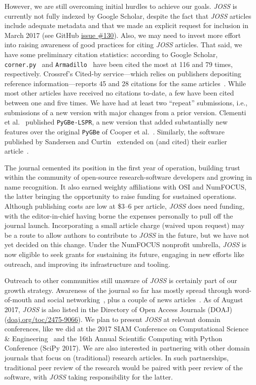 \documentclass{article}
\newcommand\joss{\textit{JOSS}}
\begin{document}
However, we are still overcoming initial hurdles to achieve our goals. \joss{} is
currently not fully indexed by Google Scholar, despite the fact that \joss{}
articles include adequate metadata and that we made an explicit request for
inclusion in March 2017 (see GitHub \href{https://github.com/openjournals/joss/issues/130}{issue \#130}).
Also, we may need to invest more effort into raising awareness of good practices
for citing \joss{} articles.
That said, we have some preliminary citation statistics: according to Google Scholar, \texttt{corner.py}~\cite{cornerpy} and \texttt{Armadillo}~\cite{armadillo} have been cited the most at 116 and 79 times, respectively.
Crossref's Cited-by service---which relies on publishers depositing reference information---reports 45 and 28 citations for the same articles~\cite{crossref-cited-by}.
While most other articles have received no citations to-date, a few have been cited between one and five times.
We have had at least two ``repeat'' submissions, i.e., submissions of a new version with major changes from a prior version.
Clementi et al.~\cite{CClementi2017} published \texttt{PyGBe-LSPR}, a new version that added substantially new features over the original \texttt{PyGBe} of Cooper et al.~\cite{DCooper2016}.
Similarly, the software published by Sandersen and Curtin~\cite{Sanderson2017} extended on (and cited) their earlier article~\cite{Sanderson2016}.

The journal cemented its position in the first year of operation, building trust within the community of open-source research-software developers and growing in name recognition.
It also earned weighty affiliations with OSI and NumFOCUS, the latter bringing the opportunity to raise funding for sustained operations.
Although publishing costs are low at \$3--6 per article, \joss{} does need funding, with the editor-in-chief having borne the expenses personally to pull off the journal launch.
Incorporating a small article charge (waived upon request) may be a route to allow authors to contribute to \joss{} in the future, but we have not yet decided on this change.
Under the NumFOCUS nonprofit umbrella, \joss{} is now eligible to seek grants for sustaining its future, engaging in new efforts like outreach, and improving its infrastructure and tooling.

Outreach to other communities still unaware of \joss{} is certainly part of our growth strategy.
Awareness of the journal so far has mostly spread through word-of-mouth and social networking~\cite{tauber-blog,titus-blog}, plus a couple of news articles~\cite{Nature:joss,SDtimes:joss}.
As of August 2017, \joss{} is also listed in the Directory of Open Access Journals (DOAJ) (\href{https://doaj.org/toc/2475-9066}{doaj.org/toc/2475-9066}).
We plan to present \joss{} at relevant domain conferences,
like we did at the 2017 SIAM Conference
on Computational Science \& Engineering~\cite{JOSS-CSE-poster} and the 16th Annual Scientific Computing with Python Conference (SciPy 2017).
We are also interested in partnering
with other domain journals that focus on (traditional) research articles.
In such partnerships,
traditional peer review of the research would be paired with peer review of the software, with \joss{} taking responsibility for the latter.
\end{document}

